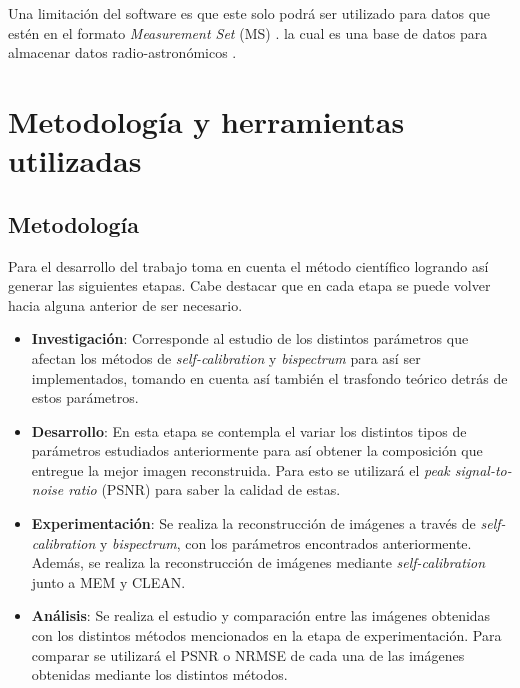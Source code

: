 Una limitación del software es que este solo podrá ser utilizado para datos que estén en el formato \textit{Measurement Set} (MS) \citep{kemball2000measurementset}. la cual es una base de datos para almacenar datos radio-astronómicos \citep{ms_set}.  

\section{Metodolog\'ia y herramientas utilizadas}
\label{intro:metodologia}

\subsection{Metodolog\'ia}

Para el desarrollo del trabajo toma en cuenta el método científico logrando así generar las siguientes etapas. Cabe destacar que en cada etapa se puede volver hacia alguna anterior de ser necesario. 

\begin{itemize}
    \item \textbf{Investigación}: Corresponde al estudio de los distintos parámetros que afectan los métodos de \textit{self-calibration} y \textit{bispectrum} para así ser implementados, tomando en cuenta así también el trasfondo teórico detrás de estos parámetros. 
    
    \item \textbf{Desarrollo}: En esta etapa se contempla el variar los distintos tipos de parámetros estudiados anteriormente para así obtener la composición que entregue la mejor imagen reconstruida. Para esto se utilizará el \textit{peak signal-to-noise ratio} (PSNR) para saber la calidad de estas.
    
    \item \textbf{Experimentación}: Se realiza la reconstrucción de imágenes a través de \textit{self-calibration} y \textit{bispectrum}, con los parámetros encontrados anteriormente. Además, se realiza la reconstrucción de imágenes mediante \textit{self-calibration} junto a MEM y CLEAN. 
    
    \item  \textbf{Análisis}: Se realiza el estudio y comparación entre las imágenes obtenidas con los distintos métodos mencionados en la etapa de experimentación. Para comparar se utilizará el PSNR o NRMSE de cada una de las imágenes obtenidas mediante los distintos métodos. 
\end{itemize}

